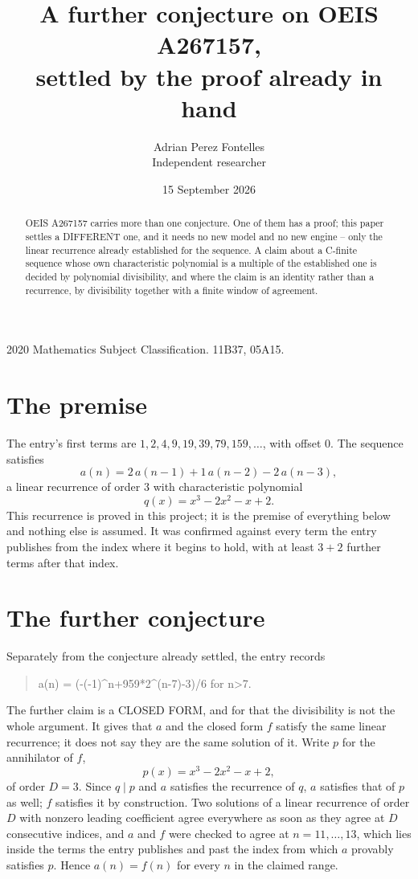 \documentclass[11pt,a4paper]{article}
\title{A further conjecture on OEIS A267157,\\ \large settled by the proof already in hand}
\author{Adrian Perez Fontelles\\ \small Independent researcher}
\date{15 September 2026}
\theoremstyle{plain}
\theoremstyle{definition}
\begin{document}
\maketitle

\begin{abstract}
OEIS A267157 carries more than one conjecture. One of them has a proof; this paper settles a
DIFFERENT one, and it needs no new model and no new engine -- only the linear recurrence already
established for the sequence. A claim about a C-finite sequence whose own characteristic
polynomial is a multiple of the established one is decided by polynomial divisibility, and where
the claim is an identity rather than a recurrence, by divisibility together with a finite window
of agreement.
\end{abstract}

\noindent\small 2020 Mathematics Subject Classification. 11B37, 05A15.\normalsize

\section{The premise}

The entry's first terms are $1, 2, 4, 9, 19, 39, 79, 159,\dots$, with offset $0$. The sequence satisfies
\[
  a(n)=2\,a(n-1) + 1\,a(n-2) - 2\,a(n-3) ,
\]
a linear recurrence of order $3$ with characteristic polynomial
\[
  q(x)=x^{3} - 2 x^{2} - x + 2 .
\]
This recurrence is proved in this project; it is the premise of everything below and nothing else is assumed.
It was confirmed against every term the entry publishes from the index where it begins to hold,
with at least $3+2$ further terms after that index.

\section{The further conjecture}

Separately from the conjecture already settled, the entry records

\begin{quote}\raggedright a(n) = (-(-1)\^{}n+959*2\^{}(n-7)-3)/6 for n>7.\end{quote}

The further claim is a CLOSED FORM, and for that the divisibility is not the whole argument. It
gives that $a$ and the closed form $f$ satisfy the same linear recurrence; it does not say they
are the same solution of it. Write $p$ for the annihilator of $f$,
\[
  p(x)=x^{3} - 2 x^{2} - x + 2 ,
\]
of order $D=3$. Since $q\mid p$ and $a$ satisfies the recurrence of $q$, $a$ satisfies that of
$p$ as well; $f$ satisfies it by construction. Two solutions of a linear recurrence of order $D$
with nonzero leading coefficient agree everywhere as soon as they agree at $D$ consecutive
indices, and $a$ and $f$ were checked to agree at $n=11,\dots,13$,
which lies inside the terms the entry publishes and past the index from which $a$ provably
satisfies $p$. Hence $a(n)=f(n)$ for every $n$ in the claimed range.
\end{document}
